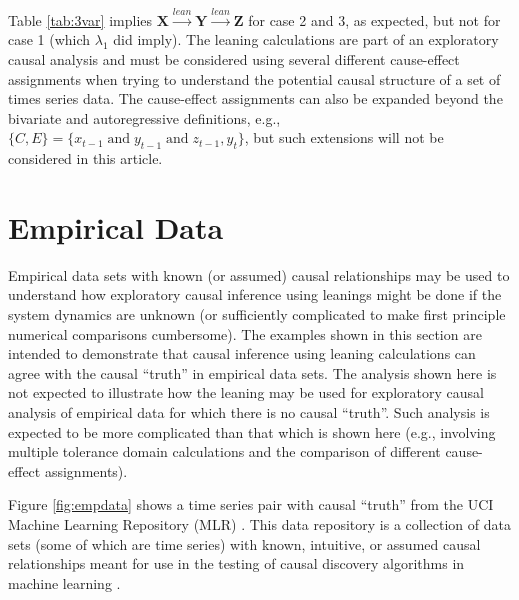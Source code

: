 \documentclass[twocolumn,aps,pre,groupedaddress]{revtex4-1}
\begin{document}
Table \ref{tab:3var} implies $\mathbf{X}\xrightarrow{lean}\mathbf{Y}\xrightarrow{lean}\mathbf{Z}$ for case 2 and 3, as expected, but not for case 1 (which $\lambda_1$ did imply).  The leaning calculations are part of an exploratory causal analysis and must be considered using several different cause-effect assignments when trying to understand the potential causal structure of a set of times series data.  The cause-effect assignments can also be expanded beyond the bivariate and autoregressive definitions, e.g., $\{C,E\} = \{x_{t-1}\;\mathrm{ and }\;y_{t-1}\;\mathrm{ and }\;z_{t-1},y_t\}$, but such extensions will not be considered in this article.

\section{Empirical Data}
\label{sec:emp}
Empirical data sets with known (or assumed) causal relationships may be used to understand how exploratory causal inference using leanings might be done if the system dynamics are unknown (or sufficiently complicated to make first principle numerical comparisons cumbersome).  The examples shown in this section are intended to demonstrate that causal inference using leaning calculations can agree with the causal ``truth'' in empirical data sets.  The analysis shown here is not expected to illustrate how the leaning may be used for exploratory causal analysis of empirical data for which there is no causal ``truth''.  Such analysis is expected to be more complicated than that which is shown here (e.g., involving multiple tolerance domain calculations and the comparison of different cause-effect assignments).

Figure \ref{fig:empdata} shows a time series pair with causal ``truth'' from the UCI Machine Learning Repository (MLR) \cite{bache2013}.  This data repository is a collection of data sets (some of which are time series) with known, intuitive, or assumed causal relationships meant for use in the testing of causal discovery algorithms in machine learning \cite{bache2013}.  
\end{document}

